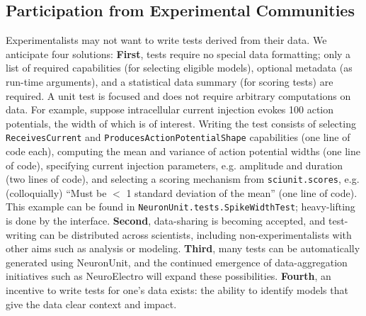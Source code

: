 \documentclass{frontiersSCNS}
\let\verbx\lstinline
\begin{document}
\subsection{Participation from Experimental Communities}
Experimentalists may not want to write tests derived from their data.  
We anticipate four solutions: 
\textbf{First}, tests require no special data formatting; only a list of required  capabilities (for selecting eligible models), optional metadata (as run-time arguments), and a statistical data summary (for scoring tests) are required. 
A unit test is focused and does not require arbitrary computations on data. 
For example, suppose intracellular current injection evokes 100 action potentials, the width of which is of interest. 
Writing the test consists of selecting \verbx{ReceivesCurrent} and \verbx{ProducesActionPotentialShape} capabilities (one line of code each), computing the mean and variance of action potential widths (one line of code), specifying current injection parameters, e.g. amplitude and duration (two lines of code), and selecting a scoring mechanism from \verbx{sciunit.scores}, e.g. (colloquially) ``Must be $<$ 1 standard deviation of the mean'' (one line of code). 
This example can be found in \verbx{NeuronUnit.tests.SpikeWidthTest}; heavy-lifting is done by the interface.
\textbf{Second}, data-sharing is becoming accepted, and test-writing can be distributed across scientists, including non-experimentalists with other aims such as analysis or modeling. 
\textbf{Third}, many tests can be automatically generated using NeuronUnit, and the continued emergence of data-aggregation initiatives such as NeuroElectro will expand these possibilities. 
\textbf{Fourth}, an incentive to write tests for one's data exists: the ability to identify models that give the data clear context and impact. 
\end{document}
